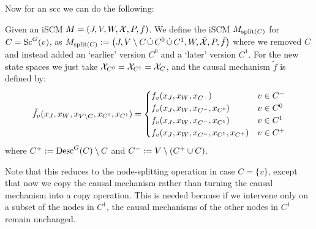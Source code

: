 {Now for an scc we can do the following:
\begin{Def}
Given an iSCM $M = \left ( J, V, W, \mathcal{X}, P, f \right )$.
We define the iSCM $M_{\mathrm{split}(C)}$ for $C = \mathrm{Sc}^G(v)$, as
  $M_{\mathrm{split}(C)} := \left ( J, V \setminus C \,\dot{\cup}\, C^0 \,\dot{\cup}\, C^1, W, \tilde{\mathcal{X}}, P, \tilde{f} \right )$
where we removed $C$ and instead added an `earlier' version $C^0$ and a `later' version $C^1$.
For the new state spaces we just take $\mathcal{X}_{C^0} = \mathcal{X}_{C^1} = \mathcal{X}_C$, and the causal mechanism $\tilde{f}$ is defined by:
  $$\tilde{f}_{v}(x_J,x_W,x_{V\setminus C},x_{C^0},x_{C^1}) = \begin{cases}
    f_v(x_J,x_W,x_{C^-}) & v \in C^- \\
    f_v(x_J,x_W,x_{C^-},x_{C^0}) & v \in C^0 \\
    f_v(x_J,x_W,x_{C^-},x_{C^1}) & v \in C^1 \\
    f_v(x_J,x_W,x_{C^-},x_{C^1},x_{C^+}) & v \in C^+ 
  \end{cases}$$
where $C^+ := \mathrm{Desc}^G(C) \setminus C$ and $C^- := V \setminus (C^+ \cup C)$.
\end{Def}
Note that this reduces to the node-splitting operation in case $C = \{v\}$, except that now we copy the causal 
mechanism rather than turning the causal mechanism into a copy operation.
This is needed because if we intervene only on a subset of the nodes in $C^1$, the causal mechanisms of the other nodes in $C^1$ remain unchanged.
}

